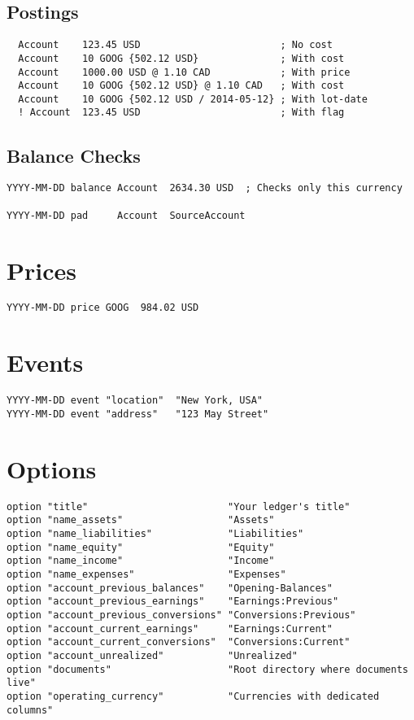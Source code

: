 \documentclass[10pt,landscape]{article}
\begin{document}
\begin{multicols}{2}
\subsection{Postings}
\begin{verbatim}
  Account    123.45 USD                        ; No cost
  Account    10 GOOG {502.12 USD}              ; With cost
  Account    1000.00 USD @ 1.10 CAD            ; With price
  Account    10 GOOG {502.12 USD} @ 1.10 CAD   ; With cost
  Account    10 GOOG {502.12 USD / 2014-05-12} ; With lot-date
  ! Account  123.45 USD                        ; With flag
\end{verbatim}

\subsection{Balance Checks}
\begin{verbatim}
YYYY-MM-DD balance Account  2634.30 USD  ; Checks only this currency

YYYY-MM-DD pad     Account  SourceAccount
\end{verbatim}



\columnbreak

\section{Prices}
\begin{verbatim}
YYYY-MM-DD price GOOG  984.02 USD
\end{verbatim}



\section{Events}
\begin{verbatim}
YYYY-MM-DD event "location"  "New York, USA"
YYYY-MM-DD event "address"   "123 May Street"
\end{verbatim}



\section{Options}
\begin{verbatim}
option "title"                        "Your ledger's title"
option "name_assets"                  "Assets"
option "name_liabilities"             "Liabilities"
option "name_equity"                  "Equity"
option "name_income"                  "Income"
option "name_expenses"                "Expenses"
option "account_previous_balances"    "Opening-Balances"
option "account_previous_earnings"    "Earnings:Previous"
option "account_previous_conversions" "Conversions:Previous"
option "account_current_earnings"     "Earnings:Current"
option "account_current_conversions"  "Conversions:Current"
option "account_unrealized"           "Unrealized"
option "documents"                    "Root directory where documents live"
option "operating_currency"           "Currencies with dedicated columns"
\end{verbatim}




\end{multicols}
\end{document}
